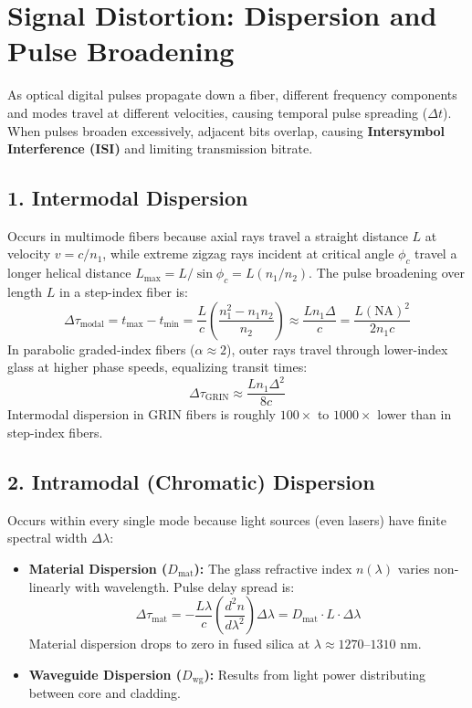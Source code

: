 \section{Signal Distortion: Dispersion and Pulse Broadening}
As optical digital pulses propagate down a fiber, different frequency components and modes travel at different velocities, causing temporal pulse spreading ($\Delta t$). When pulses broaden excessively, adjacent bits overlap, causing \textbf{Intersymbol Interference (ISI)} and limiting transmission bitrate.

\subsection{1. Intermodal Dispersion}
Occurs in multimode fibers because axial rays travel a straight distance $L$ at velocity $v = c/n_1$, while extreme zigzag rays incident at critical angle $\phi_c$ travel a longer helical distance $L_{\text{max}} = L/\sin\phi_c = L(n_1/n_2)$.
The pulse broadening over length $L$ in a step-index fiber is:
\begin{equation}
\Delta \tau_{\text{modal}} = t_{\text{max}} - t_{\text{min}} = \frac{L}{c}\left(\frac{n_1^2 - n_1 n_2}{n_2}\right) \approx \frac{L n_1 \Delta}{c} = \frac{L (\text{NA})^2}{2 n_1 c}
\end{equation}
In parabolic graded-index fibers ($\alpha \approx 2$), outer rays travel through lower-index glass at higher phase speeds, equalizing transit times:
\begin{equation}
\Delta \tau_{\text{GRIN}} \approx \frac{L n_1 \Delta^2}{8 c}
\end{equation}
Intermodal dispersion in GRIN fibers is roughly $100\times$ to $1000\times$ lower than in step-index fibers.

\subsection{2. Intramodal (Chromatic) Dispersion}
Occurs within every single mode because light sources (even lasers) have finite spectral width $\Delta\lambda$:
\begin{itemize}[itemsep=2pt]
    \item \textbf{Material Dispersion ($D_{\text{mat}}$):} The glass refractive index $n(\lambda)$ varies non-linearly with wavelength. Pulse delay spread is:
    \begin{equation}
    \Delta \tau_{\text{mat}} = -\frac{L \lambda}{c}\left(\frac{d^2 n}{d\lambda^2}\right)\Delta\lambda = D_{\text{mat}} \cdot L \cdot \Delta\lambda
    \end{equation}
    Material dispersion drops to zero in fused silica at $\lambda \approx 1270\text{--}1310\text{ nm}$.
    \item \textbf{Waveguide Dispersion ($D_{\text{wg}}$):} Results from light power distributing between core and cladding.
\end{itemize}

